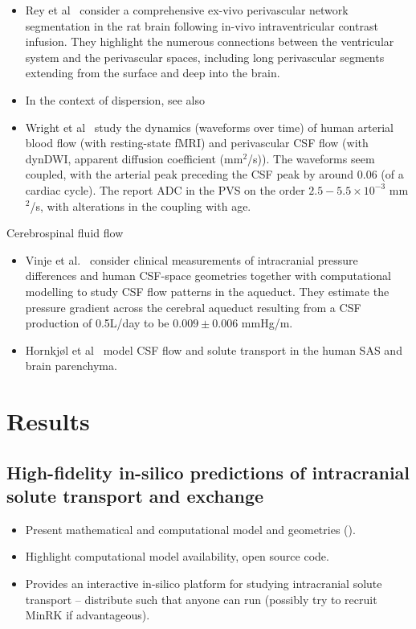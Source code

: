 \documentclass[fleqn,10pt]{wlscirep}
\begin{document}
\begin{enumerate}
\begin{itemize}
\item
  Rey et al~\cite{rey2023perivascular} consider a comprehensive ex-vivo perivascular network segmentation in the rat brain following in-vivo intraventricular contrast infusion. They highlight the numerous connections between the ventricular system and the perivascular spaces, including long perivascular segments extending from the surface and deep into the brain. 
\item
  In the context of dispersion, see also~\cite{asgari2016glymphatic, keith2019dispersion, troyetsky2021dispersion}
\item
  Wright et al~\cite{wright2024coupled} study the dynamics (waveforms over time) of human arterial blood flow (with resting-state fMRI) and perivascular CSF flow (with dynDWI, apparent diffusion coefficient (mm$^2$/s)). The waveforms seem coupled, with the arterial peak preceding the CSF peak by around 0.06 (of a cardiac cycle). The report ADC in the PVS on the order $2.5-5.5 \times 10^{-3}$ mm$^2$/s, with alterations in the coupling with age.
  \end{itemize}
\end{enumerate}
Cerebrospinal fluid flow
\begin{itemize}
\item
  Vinje et al.~\cite{vinje2019respiratory} consider clinical measurements of intracranial pressure differences and human CSF-space geometries together with computational modelling to study CSF flow patterns in the aqueduct. They estimate the pressure gradient across the cerebral aqueduct resulting from a CSF production of 0.5L/day to be $0.009 \pm 0.006$ mmHg/m.
\item Hornkjøl et al~\cite{hornkjol2022csf} model CSF flow and solute transport in the human SAS and brain parenchyma. 
\end{itemize}

\section*{Results}

\subsection*{High-fidelity in-silico predictions of intracranial solute transport and exchange}

\begin{itemize}
\item
  Present mathematical and computational model and geometries (). 
\item
  Highlight computational model availability, open source code.
\item
  Provides an interactive in-silico platform for studying intracranial solute transport -- distribute such that anyone can run (possibly try to recruit MinRK if advantageous).
\end{itemize}
\end{document}
